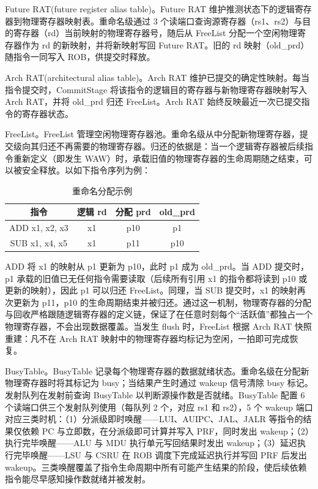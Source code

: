 Future RAT(future register alias table)。Future RAT 维护推测状态下的逻辑寄存器到物理寄存器映射表。重命名级通过 3 个读端口查询源寄存器（rs1、rs2）与目的寄存器（rd）当前映射的物理寄存器号，随后从 FreeList 分配一个空闲物理寄存器作为 rd 的新映射，并将新映射写回 Future RAT。旧的 rd 映射（old\_prd）随指令一同写入 ROB，供提交时释放。

Arch RAT(architectural alias table)。Arch RAT 维护已提交的确定性映射。每当指令提交时，CommitStage 将该指令的逻辑目的寄存器与新物理寄存器映射写入 Arch RAT，并将 old\_prd 归还 FreeList。Arch RAT 始终反映最近一次已提交指令的寄存器状态。

FreeList。FreeList 管理空闲物理寄存器池。重命名级从中分配新物理寄存器，提交级向其归还不再需要的物理寄存器。归还的依据是：当一个逻辑寄存器被后续指令重新定义（即发生 WAW）时，承载旧值的物理寄存器的生命周期随之结束，可以被安全释放。以如下指令序列为例：

\begin{table}[H]
  \centering
  \caption{重命名分配示例}
  \label{tbl:rename-example}
  \begin{tabular}{cccc}
    \toprule
    指令 & 逻辑 rd & 分配 prd & old\_prd \\
    \midrule
    ADD x1, x2, x3 & x1 & p10 & p1 \\
    SUB x1, x4, x5 & x1 & p11 & p10 \\
    \bottomrule
  \end{tabular}
\end{table}

ADD 将 x1 的映射从 p1 更新为 p10，此时 p1 成为 old\_prd。当 ADD 提交时，p1 承载的旧值已无任何指令需要读取（后续所有引用 x1 的指令都将读到 p10 或更新的映射），因此 p1 可以归还 FreeList。同理，当 SUB 提交时，x1 的映射再次更新为 p11，p10 的生命周期结束并被归还。通过这一机制，物理寄存器的分配与回收严格跟随逻辑寄存器的定义链，保证了在任意时刻每个“活跃值”都独占一个物理寄存器，不会出现数据覆盖。当发生 flush 时，FreeList 根据 Arch RAT 快照重建：凡不在 Arch RAT 映射中的物理寄存器均标记为空闲，一拍即可完成恢复。

BusyTable。BusyTable 记录每个物理寄存器的数据就绪状态。重命名级在分配新物理寄存器时将其标记为 busy；当结果产生时通过 wakeup 信号清除 busy 标记。发射队列在发射前查询 BusyTable 以判断源操作数是否就绪。BusyTable 配置 6 个读端口供三个发射队列使用（每队列 2 个，对应 rs1 和 rs2），5 个 wakeup 端口对应三类时机：（1）分派级即时唤醒——LUI、AUIPC、JAL、JALR 等指令的结果仅依赖 PC 与立即数，在分派级即可计算并写入 PRF，同时发出 wakeup；（2）执行完毕唤醒——ALU 与 MDU 执行单元写回结果时发出 wakeup；（3）延迟执行完毕唤醒——LSU 与 CSRU 在 ROB 调度下完成延迟执行并写回 PRF 后发出 wakeup。三类唤醒覆盖了指令生命周期中所有可能产生结果的阶段，使后续依赖指令能尽早感知操作数就绪并被发射。


